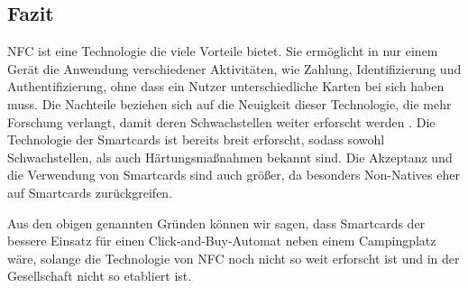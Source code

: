 
\subsection{Fazit}

NFC ist eine Technologie die viele Vorteile bietet. Sie ermöglicht in nur einem Gerät die Anwendung verschiedener
Aktivitäten, wie Zahlung, Identifizierung und Authentifizierung, ohne dass ein Nutzer unterschiedliche Karten bei
sich haben muss. Die Nachteile beziehen sich auf die Neuigkeit dieser Technologie, die mehr Forschung verlangt, 
damit deren Schwachstellen weiter erforscht werden \cite{refart:ALSI}.  Die Technologie der Smartcards ist bereits
breit erforscht, sodass sowohl Schwachstellen, als auch Härtungsmaßnahmen bekannt sind. Die Akzeptanz und die 
Verwendung von Smartcards sind auch größer, da besonders Non-Natives eher auf Smartcards zurückgreifen.

Aus den obigen genannten Gründen können wir sagen, dass Smartcards der bessere Einsatz für einen Click-and-Buy-Automat
neben einem Campingplatz wäre, solange die Technologie von NFC noch nicht so weit erforscht ist und in der 
Gesellschaft nicht so etabliert ist.
